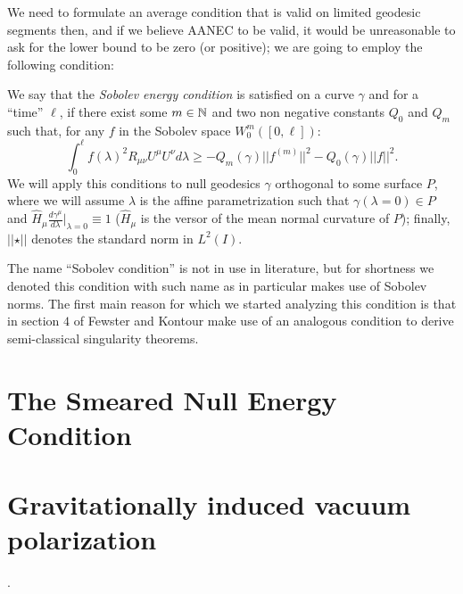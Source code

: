 We need to formulate an average condition that is valid on limited geodesic segments then, and if we believe AANEC to be valid, it would be unreasonable to ask for the lower bound to be zero (or positive); we are going to employ the following condition:

\begin{definition}
	We say that the \emph{Sobolev energy condition} is satisfied on a curve \(\gamma\) and for a ``time'' \(\ell\), if there exist some \(m\in {\mathbb{N}}\) and two non negative constants \(Q_0\) and \(Q_m\) such that, for any \(f\) in the Sobolev space \(W_0^m([0,\ell])\):
    \begin{equation}
        \label{eq:Sobolev-condition}
        \int_0^{\ell} f(\lambda)^2 R_{\mu\nu}U^{\mu}U^{\nu} d\lambda \ge -Q_m(\gamma) \vert\vert f^{(m)}\vert\vert^2 - Q_0(\gamma) \vert\vert f\vert\vert^2.
    \end{equation}
	\noindent
	We will apply this conditions to null geodesics \(\gamma\) orthogonal to some surface \(P\), where we will assume \(\lambda\) is the affine parametrization such that \(\gamma(\lambda = 0) \in P\) and \(\hat{H}_{\mu}\frac{d\gamma^{\mu}}{d\lambda}\Big\vert_{\lambda = 0} \equiv 1\) (\(\hat{H}_{\mu}\) is the versor of the mean normal curvature of \(P\)); finally, \(\vert\vert \star \vert\vert\) denotes the standard norm in \(L^2(I)\).
\end{definition}

The name ``Sobolev condition'' is not in use in literature, but for shortness we denoted this condition with such name as in particular makes use of Sobolev norms.
The first main reason for which we started analyzing this condition is that in section \(4\) of \cite{fewster2020new} Fewster and Kontour make use of an analogous condition to derive semi-classical singularity theorems.



\section{The Smeared Null Energy Condition}
\label{sec:SNEC}
	
\section{Gravitationally induced vacuum polarization}
.
	
	
	

	
	
	
	
	



